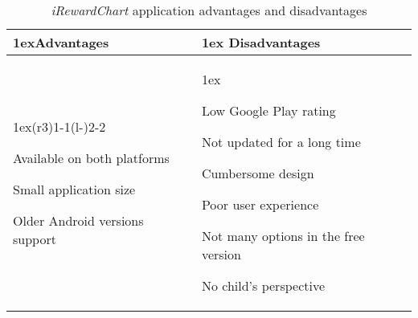 \begin{table}[htb]
\begin{tabularx}{\linewidth}{>{\parskip1ex}X@{\kern4\tabcolsep}>{\parskip1ex}X}
\toprule
\hfil\bfseries Advantages
&
\hfil\bfseries Disadvantages
\\
\cmidrule(r{3\tabcolsep}){1-1}\cmidrule(l{-\tabcolsep}){2-2}

Available on both platforms\par
Small application size\par
Older Android versions support

&

Low Google Play rating\par
Not updated for a long time\par
Cumbersome design\par
Poor user experience\par
Not many options in the free version\par
No child's perspective

\\
\bottomrule
\end{tabularx}
\caption{\textit{iRewardChart} application advantages and disadvantages}
\label{tab:applications:irewardchart}
\end{table}